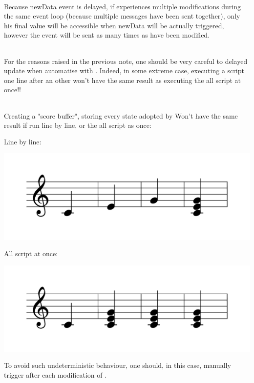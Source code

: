\note\\
Because newData event is delayed, if  experiences multiple modifications during the same event loop (because multiple  messages have been sent together), only his final value will be accessible when newData will be actually triggered, however the event will be sent as many times as  have been modified.

\\
For the reasons raised in the previous note, one should be very careful to delayed update when automatise  with . Indeed, in some extreme case, executing a script one line after an other won't have the same result as executing the all script at once!!


\example\\
Creating a "score buffer", storing every state adopted by 
Won't have the same result if run line by line, or the all script as once:

Line by line:
\begin{center}
 \includegraphics[scale=0.3]{imgs/autoSingleLine}
\end{center}

All script at once:
\begin{center}
 \includegraphics[scale=0.3]{imgs/autoAllScript}
\end{center}


To avoid such undeterministic behaviour, one should, in this case, manually trigger  after each modification of .
